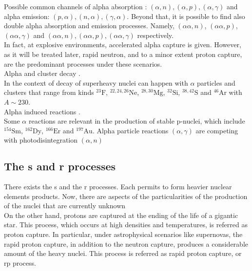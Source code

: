 \documentclass[openany]{book}
\begin{document}
Possible common channels of alpha absorption :
$(\alpha, n), (\alpha, p), (\alpha, \gamma)$ and alpha emission: $(p, \alpha), (n, \alpha),  (\gamma, \alpha)$. Beyond that, it is possible to find also double alpha absorption and emission processes. Namely, $(\alpha \alpha, n)$, $(\alpha \alpha, p)$, $(\alpha \alpha, \gamma)$ and $(\alpha \alpha, n), (\alpha \alpha, p), (\alpha \alpha, \gamma)$ respectively. \\

In fact, at explosive environments, accelerated alpha capture is given. However, as it will be treated later, rapid neutron, and to a minor extent proton capture, are the predominant processes under these scenarios. \\  


Alpha and cluster decay \cite{maroufi_dehghani_alavi_2019}. \\

In the context of decay of superheavy nuclei can happen with $\alpha$ particles and clusters that range from kinds $\mathrm{{}^{23}F}$, $\mathrm{{}^{22,24,26}Ne}$, $\mathrm{{}^{28,30}Mg}$, $\mathrm{{}^{32}Si}$, $\mathrm{{}^{38,42}S}$ and $\mathrm{{}^{46}Ar}$ with $A \sim 230$. \\

Alpha induced reactions \cite{le_duy_hung_2021}. \\

Some $\alpha$ reactions are relevant in the production of stable p-nuclei, which include $\mathrm{{}^{154}Sm}$,  $\mathrm{{}^{162}Dy}$, $\mathrm{{}^{166}Er}$ and $\mathrm{{}^{197}Au}$. Alpha particle reactions $(\alpha, \gamma)$ are competing with photodisintegration $(\alpha, n)$

\subsection{The s and r processes} \label{sub:srProcesses}

There exists the s and  the r processes. Each permits to form heavier nuclear elements products. Now, there are aspects of the particularities of the production of the nuclei that  are currently  unknown \\

On the other hand, protons are captured at the ending of the life of a gigantic star. This process, which occurs at high densities and temperatures, is referred as proton capture. In particular, under astrophysical scenarios like supernovas, the rapid proton capture, in addition to the neutron capture,  produces a considerable amount of the heavy nuclei. This process is referred as rapid proton capture, or rp process. \\ 
\end{document}
